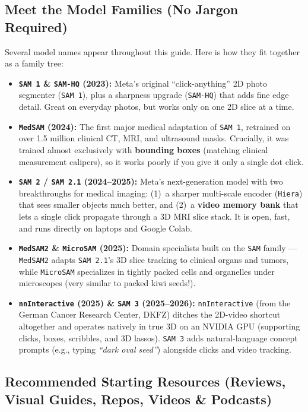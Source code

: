 \documentclass[10.5pt,a4paper]{article}
\begin{document}
\subsection{Meet the Model Families (No Jargon Required)}

Several model names appear throughout this guide. Here is how they fit together as a family tree:
\begin{itemize}
    \item \textbf{\texttt{SAM 1} \& \texttt{SAM-HQ} (2023):} Meta's original ``click-anything'' 2D photo segmenter (\texttt{SAM 1}), plus a sharpness upgrade (\texttt{SAM-HQ}) that adds fine edge detail. Great on everyday photos, but works only on one 2D slice at a time.
    \item \textbf{\texttt{MedSAM} (2024):} The first major medical adaptation of \texttt{SAM 1}, retrained on over 1.5 million clinical CT, MRI, and ultrasound masks. Crucially, it was trained almost exclusively with \textbf{bounding boxes} (matching clinical measurement calipers), so it works poorly if you give it only a single dot click.
    \item \textbf{\texttt{SAM 2} / \texttt{SAM 2.1} (2024--2025):} Meta's next-generation model with two breakthroughs for medical imaging: (1)~a sharper multi-scale encoder (\texttt{Hiera}) that sees smaller objects much better, and (2)~a \textbf{video memory bank} that lets a single click propagate through a 3D MRI slice stack. It is open, fast, and runs directly on laptops and Google Colab.
    \item \textbf{\texttt{MedSAM2} \& \texttt{MicroSAM} (2025):} Domain specialists built on the \texttt{SAM} family --- \texttt{MedSAM2} adapts \texttt{SAM 2.1}'s 3D slice tracking to clinical organs and tumors, while \texttt{MicroSAM} specializes in tightly packed cells and organelles under microscopes (very similar to packed kiwi seeds!).
    \item \textbf{\texttt{nnInteractive} (2025) \& \texttt{SAM 3} (2025--2026):} \texttt{nnInteractive} (from the German Cancer Research Center, DKFZ) ditches the 2D-video shortcut altogether and operates natively in true 3D on an NVIDIA GPU (supporting clicks, boxes, scribbles, and 3D lassos). \texttt{SAM 3} adds natural-language concept prompts (e.g., typing \emph{``dark oval seed''}) alongside clicks and video tracking.
\end{itemize}

\subsection{Recommended Starting Resources (Reviews, Visual Guides, Repos, Videos \& Podcasts)}
\end{document}
